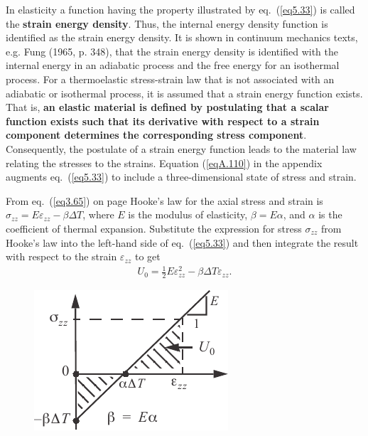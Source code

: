 \documentclass{AeroStructure-ERJohnson}
\begin{document}
In elasticity a function having the property illustrated by eq.~(\ref{eq5.33}) is called the \textbf{strain energy density}. Thus, the internal energy density function is identified as the strain energy density. It is shown in continuum mechanics texts, e.g. Fung (1965, p. 348), that the strain energy density is identified with the internal energy in an adiabatic process and the free energy for an isothermal process. For a thermoelastic stress-strain law that is not associated with an adiabatic or isothermal process, it is assumed that a strain energy function exists. That is, \textbf{an elastic material is defined by postulating that a scalar function exists such that its derivative with respect to a strain component determines the corresponding stress component}. Consequently, the postulate of\vadjust{\vspace*{5pt}\clearpage} a strain energy function leads to the material law relating the stresses to the strains. Equation (\ref{eqA.110}) in the appendix augments eq.~(\ref{eq5.33}) to include a three-dimensional state of stress and strain.

From eq.~(\ref{eq3.65}) on page \pageref{eq3.65} Hooke's law for the axial stress and strain is $\sigma_{z z}=E \varepsilon_{z z}-\beta \Delta T$, where $E$ is the modulus of elasticity, $\beta = E\alpha$, and $\alpha$ is the coefficient of thermal expansion. Substitute the expression for stress $\sigma_{zz}$ from Hooke's law into the left-hand side of eq.~(\ref{eq5.33}) and then integrate the result with respect to the strain $\varepsilon_{zz}$ to get
\begin{align}\label{eq5.34}
U_{0}=\frac{1}{2} E \varepsilon_{z z}^{2}-\beta \Delta T \varepsilon_{z z}.
\end{align}

\begin{figure}
\vspace{-19pt}
\includegraphics{Figure_5-8.pdf}
\caption{ \label{fig5.8}}
\end{figure}
\end{document}
